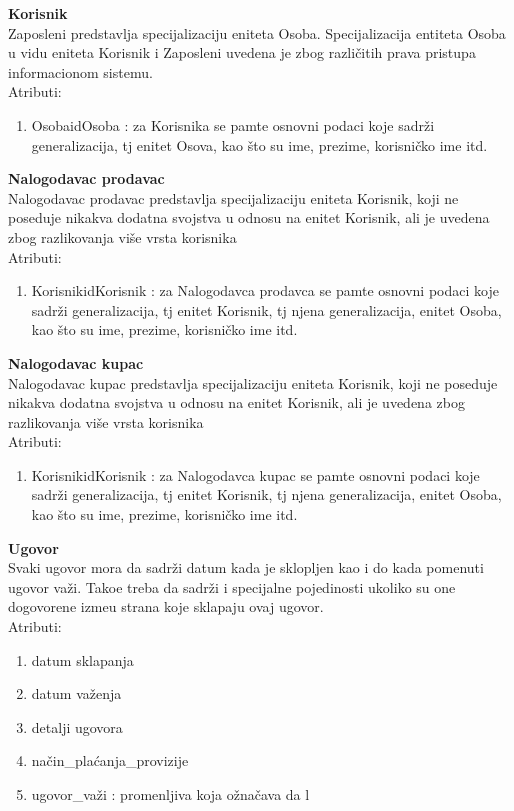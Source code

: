 \documentclass[20pt]{article}
\begin{document}
{\bfseries Korisnik}\\
Zaposleni predstavlja specijalizaciju eniteta Osoba. Specijalizacija entiteta Osoba u vidu eniteta Korisnik i Zaposleni uvedena je zbog razli\v {c}itih prava pristupa informacionom sistemu.\\
\indent Atributi:
\begin{enumerate}
        \item  OsobaidOsoba : za Korisnika se pamte osnovni podaci koje sadr\v {z}i generalizacija, tj enitet Osova, kao \v {s}to su ime, prezime, korisni\v {c}ko ime itd.
\end{enumerate}
{\bfseries Nalogodavac prodavac}\\
Nalogodavac prodavac predstavlja specijalizaciju eniteta Korisnik, koji ne poseduje nikakva dodatna svojstva u odnosu na enitet Korisnik, ali je uvedena zbog razlikovanja vi\v {s}e vrsta korisnika\\
\indent Atributi:
\begin{enumerate}
        \item  KorisnikidKorisnik : za Nalogodavca prodavca se pamte osnovni podaci koje sadr\v {z}i generalizacija, tj enitet Korisnik, tj njena generalizacija, enitet Osoba, kao \v {s}to su ime, prezime, korisni\v {c}ko ime itd.
\end{enumerate}
{\bfseries Nalogodavac kupac}\\
Nalogodavac kupac predstavlja specijalizaciju eniteta Korisnik, koji ne poseduje nikakva dodatna svojstva u odnosu na enitet Korisnik, ali je uvedena zbog razlikovanja vi\v {s}e vrsta korisnika\\
\indent Atributi:
\begin{enumerate}
        \item  KorisnikidKorisnik : za Nalogodavca kupac se pamte osnovni podaci koje sadr\v {z}i generalizacija, tj enitet Korisnik, tj njena generalizacija, enitet Osoba, kao \v {s}to su ime, prezime, korisni\v {c}ko ime itd.
\end{enumerate}
{\bfseries Ugovor}\\
Svaki ugovor mora da sadr\v {z}i datum kada je sklopljen kao i do kada pomenuti ugovor va\v {z}i. Tako\dj e treba da sadr\v {z}i i specijalne pojedinosti ukoliko su one dogovorene izme\dj u strana koje sklapaju ovaj ugovor.\\
\indent Atributi:
\begin{enumerate}
        \item  datum sklapanja
        \item  datum va\v {z}enja
        \item  detalji ugovora
        \item  na\v {c}in\_pla\' canja\_provizije
        \item  ugovor\_va\v {z}i : promenljiva koja o\v {z}na\v {c}ava da l
\end{enumerate}
\end{document}
